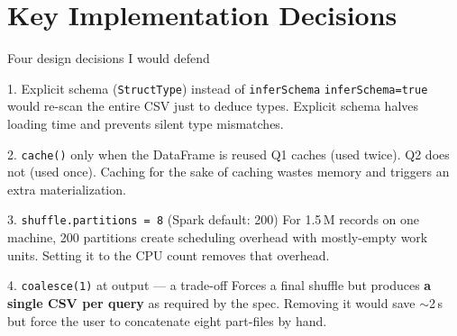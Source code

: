 \documentclass[aspectratio=169]{beamer}
\begin{document}
\section{Key Implementation Decisions}
\begin{frame}{Four design decisions I would defend}
\begin{block}{1. Explicit schema (\texttt{StructType}) instead of \texttt{inferSchema}}
\texttt{inferSchema=true} would re-scan the entire CSV just to deduce
types. Explicit schema halves loading time and prevents silent type
mismatches.
\end{block}

\begin{block}{2. \texttt{cache()} only when the DataFrame is reused}
Q1 caches (used twice). Q2 does not (used once). Caching for the
sake of caching wastes memory and triggers an extra materialization.
\end{block}

\begin{block}{3. \texttt{shuffle.partitions = 8} (Spark default: 200)}
For 1.5\,M records on one machine, 200 partitions create scheduling
overhead with mostly-empty work units. Setting it to the CPU count
removes that overhead.
\end{block}

\begin{block}{4. \texttt{coalesce(1)} at output --- a trade-off}
Forces a final shuffle but produces \textbf{a single CSV per query} as
required by the spec. Removing it would save $\sim$2\,s but force the
user to concatenate eight part-files by hand.
\end{block}

\end{frame}

\end{document}
